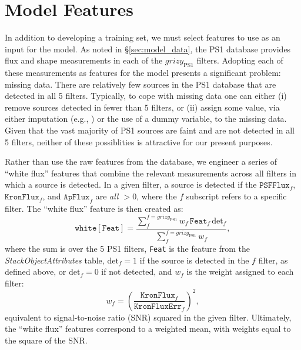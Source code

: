 \documentclass[twocolumn, dvipdfmx]{aastex62}
\begin{document}
\section{Model Features}\label{sec:model_features}

In addition to developing a training set, we must select features to use as an input for the model. As noted in \S\ref{sec:model_data}, the PS1 database provides flux and shape measurements in each of the $grizy_\mathrm{PS1}$ filters. Adopting each of these measurements as features for the model presents a significant problem: missing data. There are relatively few sources in the PS1 database that are detected in all 5 filters. Typically, to cope with missing data one can either (i) remove sources detected in fewer than 5 filters, or (ii) assign some value, via either imputation (e.g., \citealt{Miller17}) or the use of a dummy variable, to the missing data. Given that the vast majority of PS1 sources are faint and are not detected in all 5 filters, neither of these possiblities is attractive for our present purposes.

Rather than use the raw features from the database, we engineer a series of ``white flux'' features that combine the relevant measurements across all filters in which a source is detected. In a given filter, a source is detected if the $\mathtt{PSFFlux}_f$, $\mathtt{KronFlux}_f$, and $\mathtt{ApFlux}_f$ are \textit{all $> 0$}, where the $f$ subscript refers to a specific filter. The ``white flux'' feature is then created as:
%
\begin{equation}
    \mathtt{white[Feat]} =  \frac{\sum_f^{f = grizy_\mathrm{PS1}} w_f  \, \mathtt{Feat}_f \, \mathrm{det}_f}{\sum_f^{f = grizy_\mathrm{PS1}} w_f}, 
\end{equation}
%
where the sum is over the 5 PS1 filters, \texttt{Feat} is the feature from the \textit{StackObjectAttributes} table, $\mathrm{det}_f = 1$ if the source is detected in the $f$ filter, as defined above, or $\mathrm{det}_f = 0$ if not detected, and $w_f$ is the weight assigned to each filter:
%
\begin{equation}
    w_f = \left(\frac{\mathtt{KronFlux}_f}{\mathtt{KronFluxErr}_f}\right)^2,
\end{equation}
%
equivalent to signal-to-noise ratio (SNR) squared in the given filter. Ultimately, the ``white flux'' features correspond to a weighted mean, with weights equal to the square of the SNR. 
\end{document}

